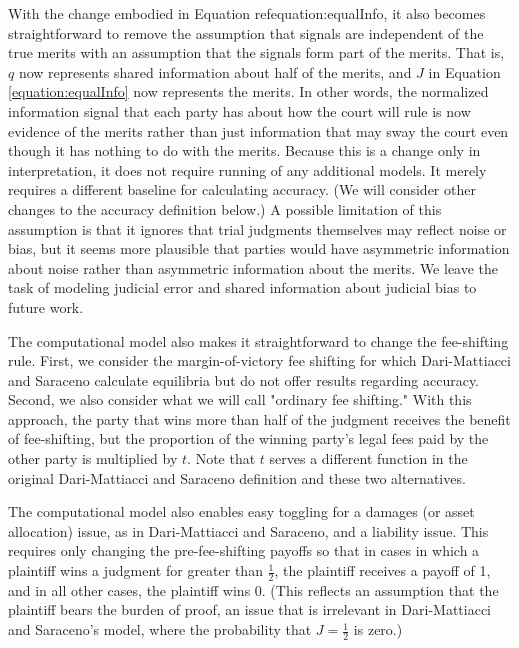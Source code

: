 \documentclass{article}
\begin{document}
With the change embodied in Equation ref{equation:equalInfo}, it also becomes straightforward to remove the assumption that signals are independent of the true merits with an assumption that the signals form part of the merits. That is, $q$ now represents shared information about half of the merits, and $J$ in Equation \ref{equation:equalInfo} now represents the merits. In other words, the normalized information signal that each party has about how the court will rule is now evidence of the merits rather than just information that may sway the court even though it has nothing to do with the merits. Because this is a change only in interpretation, it does not require running of any additional models. It merely requires a different baseline for calculating accuracy. (We will consider other changes to the accuracy definition below.) A possible limitation of this assumption is that it ignores that trial judgments themselves may reflect noise or bias, but it seems more plausible that parties would have asymmetric information about noise rather than asymmetric information about the merits. We leave the task of modeling judicial error and shared information about judicial bias to future work.

The computational model also makes it straightforward to change the fee-shifting rule. First, we consider the margin-of-victory fee shifting for which Dari-Mattiacci and Saraceno calculate equilibria but do not offer results regarding accuracy. Second, we also consider what we will call "ordinary fee shifting." With this approach, the party that wins more than half of the judgment receives the benefit of fee-shifting, but the proportion of the winning party's legal fees paid by the other party is multiplied by $t$. Note that $t$ serves a different function in the original Dari-Mattiacci and Saraceno definition and these two alternatives.

The computational model also enables easy toggling for a damages (or asset allocation) issue, as in Dari-Mattiacci and Saraceno, and a liability issue. This requires only changing the pre-fee-shifting payoffs so that in cases in which a plaintiff wins a judgment for greater than $\frac{1}{2}$, the plaintiff receives a payoff of 1, and in all other cases, the plaintiff wins 0. (This reflects an assumption that the plaintiff bears the burden of proof, an issue that is irrelevant in Dari-Mattiacci and Saraceno's model, where the probability that $J=\frac{1}{2}$ is zero.)
\end{document}

